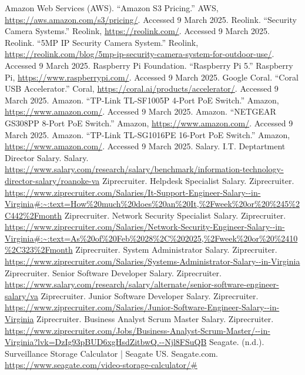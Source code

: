 \documentclass{report}
\begin{document}
\begin{thebibliography}{9}
     Amazon Web Services (AWS). ``Amazon S3 Pricing.'' AWS, \url{https://aws.amazon.com/s3/pricing/}. Accessed 9 March 2025.
     Reolink. ``Security Camera Systems.'' Reolink, \url{https://reolink.com/}. Accessed 9 March 2025.
     Reolink. ``5MP IP Security Camera System.'' Reolink, \url{https://reolink.com/blog/5mp-ip-security-camera-system-for-outdoor-use/}. Accessed 9 March 2025.
     Raspberry Pi Foundation. ``Raspberry Pi 5.'' Raspberry Pi, \url{https://www.raspberrypi.com/}. Accessed 9 March 2025.
     Google Coral. ``Coral USB Accelerator.'' Coral, \url{https://coral.ai/products/accelerator/}. Accessed 9 March 2025.
     Amazon. ``TP-Link TL-SF1005P 4-Port PoE Switch.'' Amazon, \url{https://www.amazon.com/}. Accessed 9 March 2025.
     Amazon. ``NETGEAR GS308PP 8-Port PoE Switch.'' Amazon, \url{https://www.amazon.com/}. Accessed 9 March 2025.
     Amazon. ``TP-Link TL-SG1016PE 16-Port PoE Switch.'' Amazon, \url{https://www.amazon.com/}. Accessed 9 March 2025.
     Salary. I.T. Deptartment Director Salary. Salary. \url{https://www.salary.com/research/salary/benchmark/information-technology-director-salary/roanoke-va}
     Ziprecruiter. Helpdesk Specialist Salary. Ziprecruiter. \url{https://www.ziprecruiter.com/Salaries/It-Support-Engineer-Salary--in-Virginia#:~:text=How%20much%20does%20an%20It,%2Fweek%20or%20%245%2C442%2Fmonth}
     Ziprecruiter. Network Security Specialist Salary. Ziprecruiter. \url{https://www.ziprecruiter.com/Salaries/Network-Security-Engineer-Salary--in-Virginia#:~:text=As%20of%20Feb%2028%2C%202025,%2Fweek%20or%20%2410%2C323%2Fmonth}
     Ziprecruiter. System Administrator Salary. Ziprecruiter. \url{https://www.ziprecruiter.com/Salaries/Systems-Administrator-Salary--in-Virginia}
     Ziprecruiter. Senior Software Developer Salary. Ziprecruiter. \url{https://www.salary.com/research/salary/alternate/senior-software-engineer-salary/va}
     Ziprecruiter. Junior Software Developer Salary. Ziprecruiter. \url{https://www.ziprecruiter.com/Salaries/Junior-Software-Engineer-Salary--in-Virginia}
     Ziprecruiter. Business Analyst Scrum Master  Salary. Ziprecruiter. \url{https://www.ziprecruiter.com/Jobs/Business-Analyst-Scrum-Master/--in-Virginia?lvk=DzIg93pBUD6xgHsdZitbwQ.--Njl8FSuQB}
     Seagate. (n.d.). Surveillance Storage Calculator | Seagate US. Seagate.com. \url{ https://www.seagate.com/video-storage-calculator/#}
\end{thebibliography}
\end{document}
